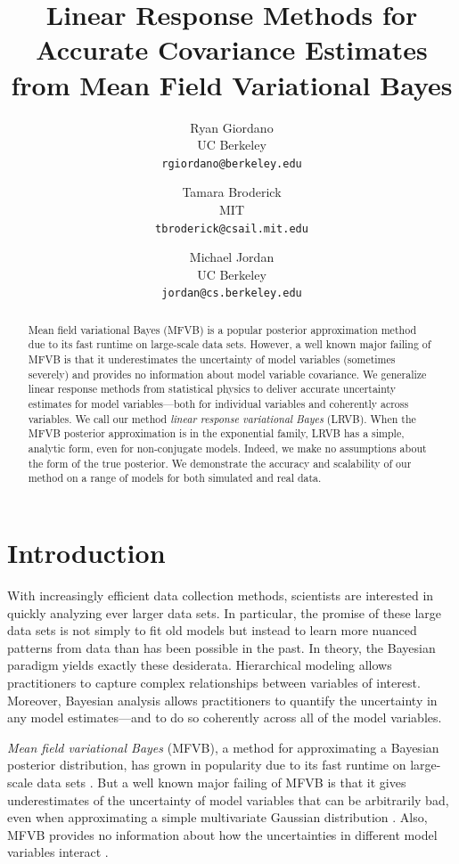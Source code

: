 \documentclass{article}\usepackage[]{graphicx}\usepackage[]{color}
\title{Linear Response Methods for Accurate Covariance Estimates from
       Mean Field Variational Bayes}
\author{
Ryan Giordano\\
UC Berkeley\\
\texttt{rgiordano@berkeley.edu}
\and
Tamara Broderick \\
MIT\\
\texttt{tbroderick@csail.mit.edu}
\and
Michael Jordan \\
UC Berkeley\\
\texttt{jordan@cs.berkeley.edu}
}
\begin{document}
\maketitle

\begin{abstract}

Mean field variational Bayes (MFVB) is a popular posterior approximation method
due to its fast runtime on large-scale data sets. However, a well known major
failing of MFVB is that it underestimates the uncertainty of model variables
(sometimes severely) and provides no information about model variable
covariance.
%
We generalize linear response methods from statistical physics
to deliver accurate uncertainty estimates for model
variables---both for individual variables and coherently across variables.
We call our method \emph{linear response variational Bayes} (LRVB).
When the MFVB posterior approximation is in the exponential family,
LRVB has a simple, analytic form, even for
non-conjugate models. Indeed, we make no assumptions about the form of the
true posterior.
%
We demonstrate the accuracy and scalability of
our method on a range of models for both simulated and real data.

\end{abstract}




\section{Introduction}\label{sec:intro}

With increasingly efficient data collection methods, scientists are interested
in quickly analyzing ever larger data sets. In particular, the promise of these
large data sets is not simply to fit old models but instead to learn more
nuanced patterns from data than has been possible in the past. In theory, the
Bayesian paradigm yields exactly these desiderata. Hierarchical modeling allows
practitioners to capture complex relationships between variables of interest.
Moreover, Bayesian analysis allows practitioners to quantify the uncertainty in
any model estimates---and to do so coherently across all of the model variables.

\emph{Mean field variational Bayes} (MFVB), a method for approximating
a Bayesian posterior distribution, has grown in
popularity due to its fast runtime on large-scale data sets
\citep{blei:2003:lda, blei:2006:dp, hoffman:2013:stochastic}.
But a well known major failing of MFVB is that it gives
underestimates of the uncertainty of model variables that can be arbitrarily
bad, even when approximating a simple multivariate Gaussian distribution
\citep{mackay:2003:information,bishop:2006:pattern,turner:2011:two}.
Also, MFVB provides no information about how
the uncertainties in different model variables interact
\citep{wang:2005:inadequacy, bishop:2006:pattern, rue:2009:approximate, turner:2011:two}.
\end{document}
